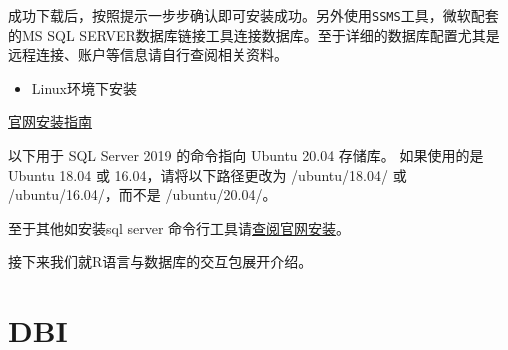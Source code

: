 \documentclass[
]{book}
\newenvironment{Shaded}{\begin{snugshade}}{\end{snugshade}}
\newcommand{\AttributeTok}[1]{\textcolor[rgb]{0.77,0.63,0.00}{#1}}
\newcommand{\CommentTok}[1]{\textcolor[rgb]{0.56,0.35,0.01}{\textit{#1}}}
\newcommand{\ExtensionTok}[1]{#1}
\newcommand{\FunctionTok}[1]{\textcolor[rgb]{0.00,0.00,0.00}{#1}}
\newcommand{\KeywordTok}[1]{\textcolor[rgb]{0.13,0.29,0.53}{\textbf{#1}}}
\newcommand{\NormalTok}[1]{#1}
\newcommand{\StringTok}[1]{\textcolor[rgb]{0.31,0.60,0.02}{#1}}
\newcommand{\VariableTok}[1]{\textcolor[rgb]{0.00,0.00,0.00}{#1}}
\providecommand{\tightlist}{%
  \setlength{\itemsep}{0pt}\setlength{\parskip}{0pt}}
\begin{document}
成功下载后，按照提示一步步确认即可安装成功。另外使用\texttt{SSMS}工具，微软配套的MS SQL SERVER数据库链接工具连接数据库。至于详细的数据库配置尤其是远程连接、账户等信息请自行查阅相关资料。

\begin{itemize}
\tightlist
\item
  Linux环境下安装
\end{itemize}

\href{https://docs.microsoft.com/zh-cn/sql/linux/sql-server-linux-setup?view=sql-server-ver15}{官网安装指南}

以下用于 SQL Server 2019 的命令指向 Ubuntu 20.04 存储库。 如果使用的是 Ubuntu 18.04 或 16.04，请将以下路径更改为 /ubuntu/18.04/ 或 /ubuntu/16.04/，而不是 /ubuntu/20.04/。

\begin{Shaded}
\end{Shaded}

至于其他如安装sql server 命令行工具请\href{https://docs.microsoft.com/zh-cn/sql/linux/quickstart-install-connect-ubuntu?view=sql-server-linux-ver15\&preserve-view=true}{查阅官网安装}。

接下来我们就R语言与数据库的交互包展开介绍。

\hypertarget{dbi}{%
\section{DBI}\label{dbi}}
\end{document}

